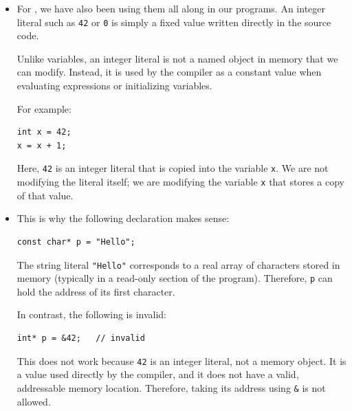 \documentclass[10pt]{article}
\newcommand{\vocab}[1]{\fbox{\textbf{\textit{#1}}}}
\begin{document}
\begin{itemize}
\begin{quote}
In contrast,

\begin{verbatim}
char str[] = "Hello";
\end{verbatim}

creates a writable character array by copying the contents of the string literal into the array. Since the array is a separate copy, modifying it is valid:

\begin{verbatim}
str[0] = 'J';   // OK
\end{verbatim}

\end{quote}

\item For \vocab{int literals}, we have also been using them all along in our programs. An integer literal such as \verb|42| or \verb|0| is simply a fixed value written directly in the source code.

Unlike variables, an integer literal is not a named object in memory that we can modify. Instead, it is used by the compiler as a constant value when evaluating expressions or initializing variables.

For example:

\begin{verbatim}
int x = 42;
x = x + 1;
\end{verbatim}

Here, \verb|42| is an integer literal that is copied into the variable \verb|x|. We are not modifying the literal itself; we are modifying the variable \verb|x| that stores a copy of that value.

\item This is why the following declaration makes sense:

\begin{verbatim}
const char* p = "Hello";
\end{verbatim}

The string literal \verb|"Hello"| corresponds to a real array of characters stored in memory (typically in a read-only section of the program). Therefore, \verb|p| can hold the address of its first character.

In contrast, the following is invalid:

\begin{verbatim}
int* p = &42;   // invalid
\end{verbatim}

This does not work because \verb|42| is an integer literal, not a memory object. It is a value used directly by the compiler, and it does not have a valid, addressable memory location. Therefore, taking its address using \verb|&| is not allowed.


\end{itemize}
\end{document}
